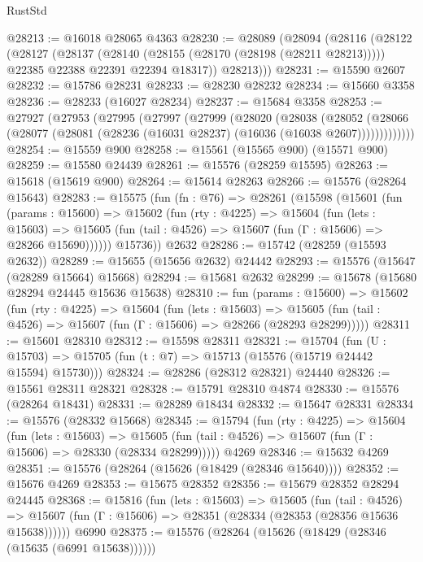 \begin{lexlean}{RustStd}
\begin{coremodule}
@28213 := @16018 @28065 @4363
@28230 := @28089
    (@28094
      (@28116
        (@28122
          (@28127
            (@28137
              (@28140 (@28155 (@28170 (@28198 (@28211 @28213)))))
              @22385
              @22388
              @22391
              @22394
              @18317))
          @28213)))
@28231 := @15590 @2607
@28232 := @15786 @28231
@28233 := @28230 @28232
@28234 := @15660 @3358
@28236 := @28233 (@16027 @28234)
@28237 := @15684 @3358
@28253 := @27927
    (@27953
      (@27995
        (@27997
          (@27999
            (@28020
              (@28038
                (@28052
                  (@28066 (@28077 (@28081 (@28236 (@16031 @28237) (@16036 (@16038 @2607)))))))))))))
@28254 := @15559 @900
@28258 := @15561 (@15565 @900) (@15571 @900)
@28259 := @15580 @24439
@28261 := @15576 (@28259 @15595)
@28263 := @15618 (@15619 @900)
@28264 := @15614 @28263
@28266 := @15576 (@28264 @15643)
@28283 := @15575
    (fun (fn : @76) =>
    @28261
      (@15598
        (@15601
          (fun (params : @15600) =>
          @15602
            (fun (rty : @4225) =>
            @15604
              (fun (lets : @15603) =>
              @15605 (fun (tail : @4526) => @15607 (fun (Γ : @15606) => @28266 @15690))))))
        @15736))
    @2632
@28286 := @15742 (@28259 (@15593 @2632))
@28289 := @15655 (@15656 @2632) @24442
@28293 := @15576 (@15647 (@28289 @15664) @15668)
@28294 := @15681 @2632
@28299 := @15678 (@15680 @28294 @24445 @15636 @15638)
@28310 := fun (params : @15600) =>
  @15602
    (fun (rty : @4225) =>
    @15604
      (fun (lets : @15603) =>
      @15605 (fun (tail : @4526) => @15607 (fun (Γ : @15606) => @28266 (@28293 @28299)))))
@28311 := @15601 @28310
@28312 := @15598 @28311
@28321 := @15704
    (fun (U : @15703) => @15705 (fun (t : @7) => @15713 (@15576 (@15719 @24442 @15594) @15730)))
@28324 := @28286 (@28312 @28321) @24440
@28326 := @15561 @28311 @28321
@28328 := @15791 @28310 @4874
@28330 := @15576 (@28264 @18431)
@28331 := @28289 @18434
@28332 := @15647 @28331
@28334 := @15576 (@28332 @15668)
@28345 := @15794
    (fun (rty : @4225) =>
    @15604
      (fun (lets : @15603) =>
      @15605 (fun (tail : @4526) => @15607 (fun (Γ : @15606) => @28330 (@28334 @28299)))))
    @4269
@28346 := @15632 @4269
@28351 := @15576 (@28264 (@15626 (@18429 (@28346 @15640))))
@28352 := @15676 @4269
@28353 := @15675 @28352
@28356 := @15679 @28352 @28294 @24445
@28368 := @15816
    (fun (lets : @15603) =>
    @15605
      (fun (tail : @4526) =>
      @15607 (fun (Γ : @15606) => @28351 (@28334 (@28353 (@28356 @15636 @15638))))))
    @6990
@28375 := @15576 (@28264 (@15626 (@18429 (@28346 (@15635 (@6991 @15638))))))

\end{coremodule}
\end{lexlean}
